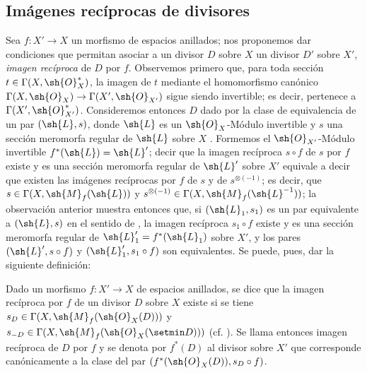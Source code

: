 \subsection{Imágenes recíprocas de divisores}
\label{subsection:IV.21.4}
\label{IV.21.4}

\begin{env}[21.4.1]
\label{IV.21.4.1}
Sea $f:X'\to X$ un morfismo de espacios anillados;
nos proponemos dar condiciones que permitan asociar a un divisor $D$ sobre $X$ un divisor $D'$ sobre $X'$, \emph{imagen recíproca} de $D$ por $f$.
Observemos primero que, para toda sección $t\in\Gamma(X,\sh{O}_X^*)$, la imagen de $t$ mediante el homomorfismo canónico $\Gamma(X,\sh{O}_X)\to\Gamma(X',\sh{O}_{X'})$ sigue siendo invertible; es decir, pertenece a $\Gamma(X',\sh{O}_{X'}^*)$.
Consideremos entonces $D$ dado por la clase de equivalencia de un par $(\sh{L},s)$, donde $\sh{L}$ es un $\sh{O}_X$-Módulo invertible y $s$ una sección meromorfa regular de $\sh{L}$ sobre $X$ .
Formemos el $\sh{O}_{X'}$-Módulo invertible $f^*(\sh{L})=\sh{L}'$;
decir que la imagen recíproca $s\circ f$ de $s$ por $f$ existe  y es una sección meromorfa regular de $\sh{L}'$ sobre $X'$ equivale a decir que existen las imágenes recíprocas por $f$ de $s$ y de $s^{\otimes(-1)}$; es decir, que $s\in\Gamma(X,\sh{M}_f(\sh{L}))$ y $s^{\otimes(-1)}\in\Gamma(X,\sh{M}_f(\sh{L}^{-1}))$;
la observación anterior muestra entonces que, si $(\sh{L}_1,s_1)$ es un par equivalente a $(\sh{L},s)$ en el sentido de , la imagen recíproca $s_1\circ f$ existe y es una sección meromorfa regular de $\sh{L}_1'=f^*(\sh{L}_1)$ sobre $X'$, y los pares $(\sh{L}',s\circ f)$ y $(\sh{L}_1',s_1\circ f)$ son equivalentes.
Se puede, pues, dar la siguiente definición:
\end{env}

\begin{definition}[21.4.2]
\label{IV.21.4.2}
Dado un morfismo $f:X'\to X$ de espacios anillados, se dice que la imagen recíproca por $f$ de un divisor $D$ sobre $X$ existe si se tiene $s_D\in\Gamma(X,\sh{M}_f(\sh{O}_X(D)))$ y $s_{-D}\in\Gamma(X,\sh{M}_f(\sh{O}_X(\setmin D)))$ \textup{(cf. )}.
Se llama entonces imagen recíproca de $D$ por $f$ y se denota por $f^*(D)$ al divisor sobre $X'$ que corresponde canónicamente  a la clase del par $(f^*(\sh{O}_X(D)),s_D\circ f)$.
\end{definition}


